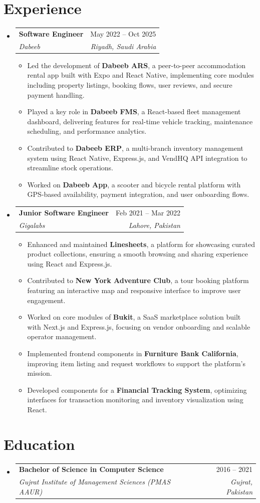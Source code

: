 \documentclass[letterpaper,11pt]{article}
\makeatletter
\newcommand{\resumeItem}[1]{\item\small{{#1 \vspace{-2pt}}}}
\newcommand{\resumeSubheading}[4]{
  \vspace{-2pt}\item
  \begin{tabular*}{0.97\textwidth}[t]{l@{\extracolsep{\fill}}r}
    \textbf{#1} & #2 \\
    \textit{\small#3} & \textit{\small #4} \\
  \end{tabular*}\vspace{-7pt}
}
\newcommand{\resumeSubHeadingListStart}{\begin{itemize}[leftmargin=0.15in, label={}]}
\newcommand{\resumeSubHeadingListEnd}{\end{itemize}}
\newcommand{\resumeItemListStart}{\begin{itemize}}
\newcommand{\resumeItemListEnd}{\end{itemize}\vspace{-5pt}}
\makeatother
\begin{document}
\section{Experience}
\resumeSubHeadingListStart

  \resumeSubheading
    {Software Engineer}{May 2022 -- Oct 2025}
    {Dabeeb}{Riyadh, Saudi Arabia}
    \resumeItemListStart
      \resumeItem{Led the development of \textbf{Dabeeb ARS}, a peer-to-peer accommodation rental app built with Expo and React Native, implementing core modules including property listings, booking flows, user reviews, and secure payment handling.}
      \resumeItem{Played a key role in \textbf{Dabeeb FMS}, a React-based fleet management dashboard, delivering features for real-time vehicle tracking, maintenance scheduling, and performance analytics.}
      \resumeItem{Contributed to \textbf{Dabeeb ERP}, a multi-branch inventory management system using React Native, Express.js, and VendHQ API integration to streamline stock operations.}
      \resumeItem{Worked on \textbf{Dabeeb App}, a scooter and bicycle rental platform with GPS-based availability, payment integration, and user onboarding flows.}
    \resumeItemListEnd

  \resumeSubheading
    {Junior Software Engineer}{Feb 2021 -- Mar 2022}
    {Gigalabs}{Lahore, Pakistan}
    \resumeItemListStart
      \resumeItem{Enhanced and maintained \textbf{Linesheets}, a platform for showcasing curated product collections, ensuring a smooth browsing and sharing experience using React and Express.js.}
      \resumeItem{Contributed to \textbf{New York Adventure Club}, a tour booking platform featuring an interactive map and responsive interface to improve user engagement.}
      \resumeItem{Worked on core modules of \textbf{Bukit}, a SaaS marketplace solution built with Next.js and Express.js, focusing on vendor onboarding and scalable operator management.}
      \resumeItem{Implemented frontend components in \textbf{Furniture Bank California}, improving item listing and request workflows to support the platform’s mission.}
      \resumeItem{Developed components for a \textbf{Financial Tracking System}, optimizing interfaces for transaction monitoring and inventory visualization using React.}
    \resumeItemListEnd

\resumeSubHeadingListEnd

\section{Education}
\resumeSubHeadingListStart
  \resumeSubheading
    {Bachelor of Science in Computer Science}{2016 -- 2021}
    {Gujrat Institute of Management Sciences (PMAS AAUR)}{Gujrat, Pakistan}
\resumeSubHeadingListEnd
\end{document}
